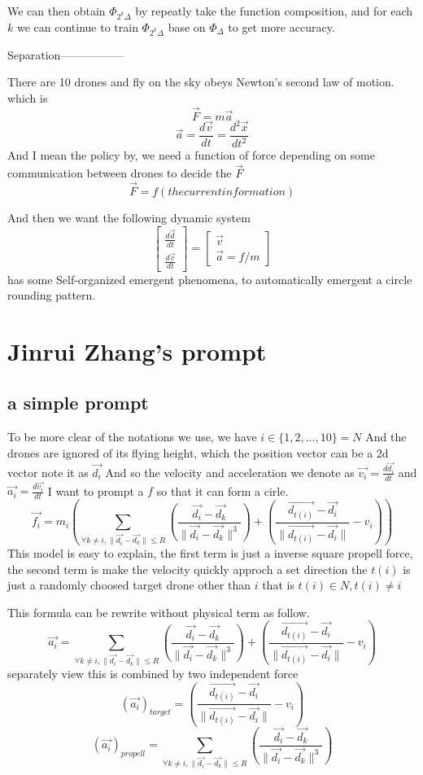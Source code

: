 \documentclass{article}
\theoremstyle{definition} %
\begin{document}
We can then obtain \(\Phi_{2^k\Delta}\)
by repeatly take the function composition,
and for each \(k\) we can
continue to train \(\Phi_{2^k\Delta}\)
base on \(\Phi_\Delta\) to get more accuracy.

Separation-----------------

There are 10 drones and fly on the sky
obeys Newton's second law of motion.
which is
\[
    \vec{F} = m \vec{a}
\]
\[
    \vec{a} = \frac{d\vec{v}}{dt} = \frac{d^2 \vec{x}}{dt^2}
\]
And I mean the policy by, we need a function of force
depending on some communication between drones
to decide the \(\vec{F}\)
\[
    \vec{F}=f(the current information)
\]

And then we want the following dynamic system
\[\begin{bmatrix}
        \frac{d\vec{d}}{dt} \\
        \frac{d\vec{v}}{dt}
    \end{bmatrix}=
    \begin{bmatrix}
        \vec{v} \\
        \vec{a}=f/m
    \end{bmatrix}
\]
has some Self-organized emergent phenomena,
to automatically emergent a circle rounding pattern.

\section{Jinrui Zhang's prompt}
\subsection{a simple prompt}
To be more clear of the notations we use,
we have \(i\in\{1,2,...,10\}=N\)
And the drones are ignored of its flying
height, which the position vector can be a
2d vector note it as \(\vec{d_i}\)
And so the velocity and acceleration we denote as
\(\vec{v_i}=\frac{d\vec{d_i}}{dt}\)
and
\(\vec{a_i}=\frac{d\vec{v_i}}{dt}\)
I want to prompt a \(f\) so that it can form
a cirle.
\[
    \vec{f_i}=m_i(\sum_{\forall k\neq i,\|\vec{d_i}-\vec{d_k}\|\leq R}(\frac{\vec{d_i}-\vec{d_k}}{\|\vec{d_i}-\vec{d_k}\|^3})+(\frac{\vec{d_{t(i)}}-\vec{d_i}}{\|\vec{d_{t(i)}}-\vec{d_i}\|}-v_i))
\]
This model is easy to explain, the first term is
just a inverse square propell force, the second
term is make the velocity quickly approch a set direction
the \(t(i)\) is just a randomly choosed target drone
other than \(i\) that is \(t(i)\in N, t(i)\neq i\)

This formula can be rewrite without physical term as
follow.
\[
    \vec{a_i}=\sum_{\forall k\neq i,\|\vec{d_i}-\vec{d_k}\|\leq R}(\frac{\vec{d_i}-\vec{d_k}}{\|\vec{d_i}-\vec{d_k}\|^3})+(\frac{\vec{d_{t(i)}}-\vec{d_i}}{\|\vec{d_{t(i)}}-\vec{d_i}\|}-v_i)
\]
separately view this is combined by two independent force
\[
    (\vec{a_i})_{target}=(\frac{\vec{d_{t(i)}}-\vec{d_i}}{\|\vec{d_{t(i)}}-\vec{d_i}\|}-v_i)
\]
\[
    (\vec{a_i})_{propell}=\sum_{\forall k\neq i,\|\vec{d_i}-\vec{d_k}\|\leq R}(\frac{\vec{d_i}-\vec{d_k}}{\|\vec{d_i}-\vec{d_k}\|^3})
\]
\end{document}
